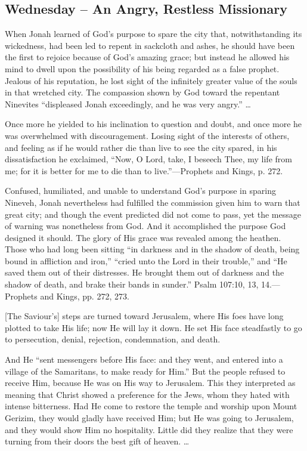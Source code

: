 \documentclass[a4paper, 10pt, twoside, headings=small]{scrartcl}
\begin{document}
\begin{multicols}{2}
\section*{Wednesday – An Angry, Restless Missionary}

When Jonah learned of God’s purpose to spare the city that, notwithstanding its wickedness, had been led to repent in sackcloth and ashes, he should have been the first to rejoice because of God’s amazing grace; but instead he allowed his mind to dwell upon the possibility of his being regarded as a false prophet. Jealous of his reputation, he lost sight of the infinitely greater value of the souls in that wretched city. The compassion shown by God toward the repentant Ninevites “displeased Jonah exceedingly, and he was very angry.” …

Once more he yielded to his inclination to question and doubt, and once more he was overwhelmed with discouragement. Losing sight of the interests of others, and feeling as if he would rather die than live to see the city spared, in his dissatisfaction he exclaimed, “Now, O Lord, take, I beseech Thee, my life from me; for it is better for me to die than to live.”—Prophets and Kings, p. 272.

Confused, humiliated, and unable to understand God’s purpose in sparing Nineveh, Jonah nevertheless had fulfilled the commission given him to warn that great city; and though the event predicted did not come to pass, yet the message of warning was nonetheless from God. And it accomplished the purpose God designed it should. The glory of His grace was revealed among the heathen. Those who had long been sitting “in darkness and in the shadow of death, being bound in affliction and iron,” “cried unto the Lord in their trouble,” and “He saved them out of their distresses. He brought them out of darkness and the shadow of death, and brake their bands in sunder.” Psalm 107:10, 13, 14.—Prophets and Kings, pp. 272, 273.

[The Saviour’s] steps are turned toward Jerusalem, where His foes have long plotted to take His life; now He will lay it down. He set His face steadfastly to go to persecution, denial, rejection, condemnation, and death.

And He “sent messengers before His face: and they went, and entered into a village of the Samaritans, to make ready for Him.” But the people refused to receive Him, because He was on His way to Jerusalem. This they interpreted as meaning that Christ showed a preference for the Jews, whom they hated with intense bitterness. Had He come to restore the temple and worship upon Mount Gerizim, they would gladly have received Him; but He was going to Jerusalem, and they would show Him no hospitality. Little did they realize that they were turning from their doors the best gift of heaven. …


\end{multicols}
\end{document}
